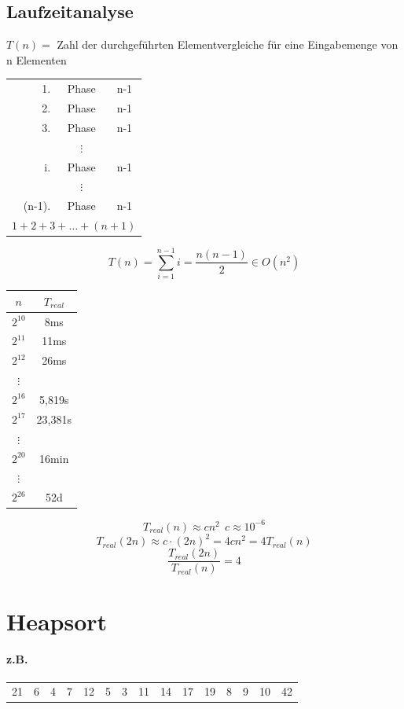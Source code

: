 \pagebreak

\subsection{Laufzeitanalyse}

$T(n) =$ Zahl der durchgeführten Elementvergleiche für eine Eingabemenge von n Elementen\\

\begin{tabular}{rcc}
	1.&Phase & n-1 \\
	2.&Phase & n-1 \\
	3.&Phase & n-1 \\
	 & $\vdots$ &  \\
	i.& Phase & n-1 \\
	 & $\vdots$ &  \\
	(n-1).&Phase & n-1 \\ \hline
	\multicolumn{3}{c}{$1+2+3+\ldots+(n+1)$}
\end{tabular}
\[ T(n)=\sum_{i=1}^{n-1} i = \frac{n(n-1)}{2}\in O(n^2) \]
\begin{tabular}{c|c}
	$n$ & $T_{real}$ \\ \hline
	$2^{10}$ & 8ms \\
	$2^{11}$ & 11ms \\
	$2^{12}$ & 26ms \\
	$\vdots$ &  \\
	$2^{16}$ & 5,819s \\
	$2^{17}$ & 23,381s \\
	$\vdots$ &  \\
	$2^{20}$ & 16min \\
	$\vdots$ &  \\
	$2^{26}$ & 52d 
\end{tabular}
\[ T_{real}(n)\approx cn^2~~ c\approx10^{-6}\]
\[T_{real} (2n) \approx c \cdot (2n)^2 = 4 cn^2 = 4T_{real}(n) \]
\[\frac{T_{real}(2n)}{T_{real}(n)} = 4 \]



\section{Heapsort}
\paragraph{z.B.} \begin{tabular}{ccccccccccccccc}
	21&6&4&7&12&5&3&11&14&17&19&8&9&10&42
\end{tabular}

